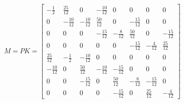 \documentclass[a4paper, 12pt]{article}
\begin{document}
\[
M=P K = 
\begin{bmatrix}
-\frac{1}{2} & \frac{25}{12} & 0 & -\frac{10}{12} & 0 & 0 & 0 & 0 \\
0 & -\frac{10}{12} & -\frac{10}{12} & \frac{50}{12} & 0 & -\frac{15}{12} & 0 & 0 \\
0 & 0 & 0 & -\frac{15}{12} & -\frac{8}{12} & \frac{50}{12} & 0 & -\frac{15}{12} \\
0 & 0 & 0 & 0 & 0 & -\frac{15}{12} & -\frac{4}{12} & \frac{25}{12} \\
\frac{25}{12} & -\frac{1}{2} & -\frac{10}{12} & 0 & 0 & 0 & 0 & 0 \\
-\frac{10}{12} & 0 & \frac{50}{12} & -\frac{10}{12} & -\frac{15}{12} & 0 & 0 & 0 \\
0 & 0 & -\frac{15}{12} & 0 & \frac{50}{12} & -\frac{8}{12} & -\frac{15}{12} & 0 \\
0 & 0 & 0 & 0 & -\frac{15}{12} & 0 & \frac{25}{12} & -\frac{4}{12}
\end{bmatrix}
\]
\end{document}
